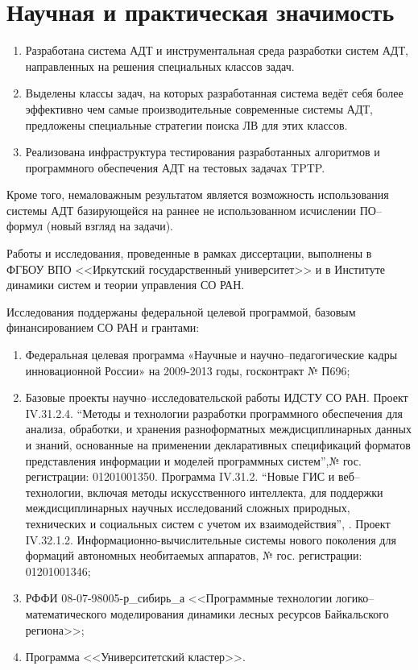 \section*{Научная и практическая значимость}
\begin{enumerate}
\item Разработана система АДТ и инструментальная среда разработки систем АДТ, направленных на решения специальных классов задач.
\item Выделены классы задач, на которых разработанная система ведёт себя более эффективно чем самые производительные современные системы АДТ, предложены специальные стратегии поиска ЛВ для этих классов.
\item Реализована инфраструктура тестирования разработанных алгоритмов и программного обеспечения АДТ на тестовых задачах TPTP. %
\end{enumerate}

Кроме того, немаловажным результатом является возможность использования системы АДТ базирующейся на раннее не использованном исчислении ПО--формул (новый взгляд на задачи).

Работы и исследования, проведенные в рамках  диссертации, выполнены в ФГБОУ ВПО <<Иркутский государственный университет>> и в Институте динамики систем и теории управления СО РАН.

Исследования поддержаны федеральной целевой программой, базовым финансированием СО РАН и грантами:
\begin{enumerate}
\item Федеральная целевая программа «Научные и научно--педагогические кадры инновационной России» на 2009-2013 годы, госконтракт № П696;
\item Базовые проекты научно--исследовательской работы ИДСТУ СО РАН. Проект IV.31.2.4. ``Методы и технологии разработки программного обеспечения для анализа, обработки, и хранения разноформатных междисциплинарных данных и знаний, основанные на применении декларативных спецификаций форматов представления информации и моделей программных систем'',№ гос. регистрации: 01201001350. Программа IV.31.2. ``Новые ГИС и веб--технологии, включая методы искусственного интеллекта, для поддержки междисциплинарных научных исследований сложных природных, технических и социальных систем с учетом их взаимодействия'', . Проект IV.32.1.2. Информационно-вычислительные системы нового поколения для формаций автономных необитаемых аппаратов, № гос. регистрации: 01201001346;
\item РФФИ 08-07-98005-р\_сибирь\_а <<Программные технологии логико--математического моделирования динамики лесных ресурсов Байкальского региона>>;
\item Программа <<Университетский кластер>>.
\end{enumerate}

